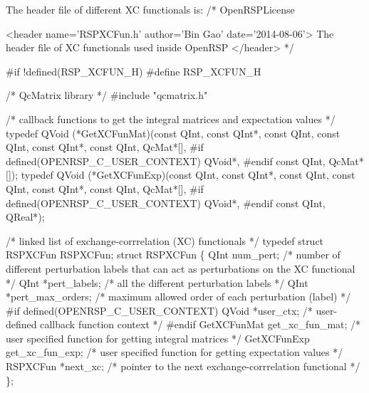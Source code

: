 The header file of different XC functionals is:
\nwenddocs{}\endmoddef
/*
  \LA{}OpenRSPLicense~{\nwtagstyle{}}\RA{}

  <header name='RSPXCFun.h' author='Bin Gao' date='2014-08-06'>
    The header file of XC functionals used inside OpenRSP
  </header>
*/

#if !defined(RSP_XCFUN_H)
#define RSP_XCFUN_H

/* QcMatrix library */
#include "qcmatrix.h"

/* callback functions to get the integral matrices and expectation values */
typedef QVoid (*GetXCFunMat)(const QInt,
                             const QInt*,
                             const QInt,
                             const QInt,
                             const QInt*,
                             const QInt,
                             QcMat*[],
#if defined(OPENRSP_C_USER_CONTEXT)
                             QVoid*,
#endif
                             const QInt,
                             QcMat*[]);
typedef QVoid (*GetXCFunExp)(const QInt,
                             const QInt*,
                             const QInt,
                             const QInt,
                             const QInt*,
                             const QInt,
                             QcMat*[],
#if defined(OPENRSP_C_USER_CONTEXT)
                             QVoid*,
#endif
                             const QInt,
                             QReal*);

/* linked list of exchange-corrrelation (XC) functionals */
typedef struct RSPXCFun RSPXCFun;
struct RSPXCFun \{
    QInt num_pert;               /* number of different perturbation labels that
                                    can act as perturbations on the XC functional */
    QInt *pert_labels;           /* all the different perturbation labels */
    QInt *pert_max_orders;       /*  maximum allowed order of each perturbation (label) */
#if defined(OPENRSP_C_USER_CONTEXT)
    QVoid *user_ctx;             /* user-defined callback function context */
#endif
    GetXCFunMat get_xc_fun_mat;  /* user specified function for getting integral matrices */
    GetXCFunExp get_xc_fun_exp;  /* user specified function for getting expectation values */
    RSPXCFun *next_xc;           /* pointer to the next exchange-corrrelation functional */
\};

